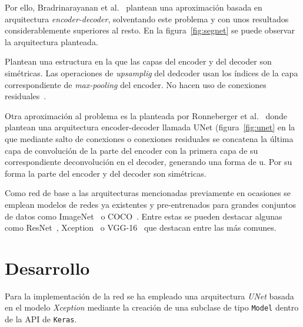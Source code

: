 \documentclass[a4paper]{article}
\begin{document}
Por ello, Bradrinarayanan et al.~\cite{encoderDecoder} plantean una aproximaci\'on basada en arquitectura \textit{encoder-decoder}, solventando este problema y con unos resultados considerablemente superiores al resto.
En la figura~\ref{fig:segnet} se puede observar la arquitectura planteada.
\newline

Plantean una estructura en la que las capas del encoder y del decoder son sim\'etricas.
Las operaciones de \textit{upsamplig} del dedcoder usan los \'indices de la capa correspondiente de \textit{max-pooling} del encoder.
No hacen uso de conexiones residuales~\cite{resnet}.
\newline

Otra aproximaci\'on al problema es la planteada por Ronneberger et al.~\cite{unet} donde plantean una arquitectura encoder-decoder llamada UNet (figura~\ref{fig:unet} en la que mediante salto de conexiones o conexiones residuales se concatena la \'ultima capa de convoluci\'on de la parte del encoder con la primera capa de su correspondiente deconvoluci\'on en el decoder, generando una forma de u.
Por su forma la parte del encoder y del decoder son sim\'etricas.
\newline

Como red de base a las arquitecturas mencionadas previamente en ocasiones se emplean modelos de redes ya existentes y pre-entrenados para grandes conjuntos de datos como ImageNet~\cite{imagenet} o COCO~\cite{coco}.
Entre estas se pueden destacar algunas como ResNet~\cite{resnet}, Xception~\cite{xception} o VGG-16~\cite{vgg} que destacan entre las m\'as comunes.



\section{Desarrollo}
Para la implementación de la red se ha empleado una arquitectura \textit{UNet} basada en el modelo \textit{Xception} mediante la creaci\'on de una subclase de tipo \texttt{Model} dentro de la API de \texttt{Keras}.
\newline
\end{document}

